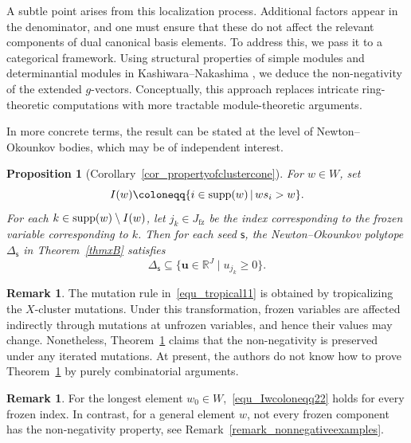 \documentclass[11pt]{amsart}
\newcommand{\R}{\mathbb{R}}
\numberwithin{equation}{section}
\theoremstyle{plain}
\newtheorem{propx}[thmx]{Proposition}
\theoremstyle{definition}
\newtheorem{remark}[theorem]{Remark}
\numberwithin{equation}{section}
\newcommand{\seed}{\mathsf{s}}
\begin{document}
A subtle point arises from this localization process. Additional factors appear in the denominator, and one must ensure that these do not affect the relevant components of dual canonical basis elements. To address this, we pass it to a categorical framework. Using structural properties of simple modules and determinantial modules in Kashiwara--Nakashima \cite{KN25}, we deduce the non-negativity of the extended $g$-vectors. Conceptually, this approach replaces intricate ring-theoretic computations with more tractable module-theoretic arguments.

In more concrete terms, the result can be stated at the level of Newton--Okounkov bodies, which may be of independent interest.

\begin{propx}[Corollary~\ref{cor_propertyofclustercone}]\label{thmx_E}
For $w \in W$, set 
\begin{equation}\label{equ_Iwcoloneqq}
I(w) \coloneqq \{i\in {\rm supp}(w) \, \vert \, ws_i>w\}.
\end{equation}
For each $k \in {\rm supp}(w) \setminus I(w)$, let $j_{k} \in J_\mathrm{fz}$ be the index corresponding to the frozen variable corresponding to $k$. Then for each seed $\seed$, the Newton--Okounkov polytope $\Delta_\seed$ in Theorem~\ref{thmxB} satisfies
\begin{equation}\label{equ_Iwcoloneqq22}
\Delta_\seed \subseteq \{ \mathbf{u} \in \R^J \mid u_{j_k} \geq 0 \}.
\end{equation}
\end{propx}

\begin{remark}
The mutation rule in~\eqref{equ_tropical11} is obtained by tropicalizing the $X$-cluster mutations. Under this transformation, frozen variables are affected indirectly through mutations at unfrozen variables, and hence their values may change. Nonetheless, Theorem~\ref{thmx_E} claims that the non-negativity is preserved under any iterated mutations. At present, the authors do not know how to prove Theorem~\ref{thmx_E} by purely combinatorial arguments.
\end{remark}

\begin{remark}
For the longest element $w_0 \in W$,~\eqref{equ_Iwcoloneqq22} holds for every frozen index. In contrast, for a general element $w$, not every frozen component has the non-negativity property, see Remark~\ref{remark_nonnegativeexamples}.
\end{remark}
\end{document}
